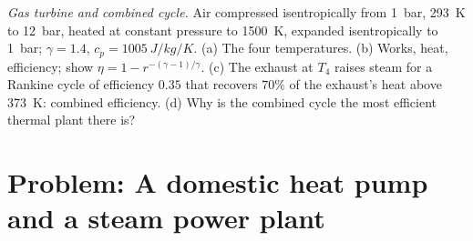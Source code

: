 \begin{exercise}[$\star\star\star$]\label{exo:b2:open-systems:12}
\emph{Gas turbine and combined cycle.} Air compressed isentropically
from \qty{1}{bar}, \qty{293}{K} to \qty{12}{bar}, heated at constant pressure
to \qty{1500}{K}, expanded isentropically to \qty{1}{bar}; $\gamma = 1.4$,
$c_p = \qty{1005}{J/kg/K}$. (a) The four temperatures. (b) Works,
heat, efficiency; show $\eta = 1 - r^{-(\gamma - 1)/\gamma}$. (c) The
exhaust at $T_4$ raises steam for a Rankine cycle of efficiency $0.35$
that recovers $70\%$ of the exhaust's heat above \qty{373}{K}: combined
efficiency. (d) Why is the combined cycle the most efficient thermal
plant there is?
\end{exercise}

\section{Problem: A domestic heat pump and a steam power plant}

